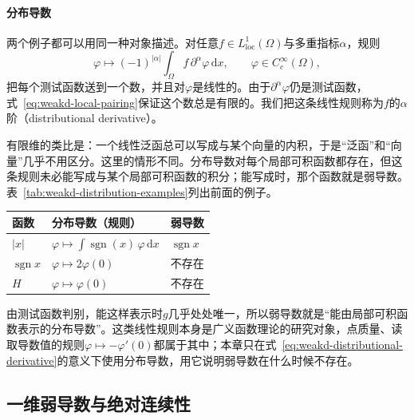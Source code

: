 \paragraph{分布导数}
两个例子都可以用同一种对象描述。对任意$f\in L^1_{\mathrm{loc}}(\Omega)$与多重指标$\alpha$，规则
\begin{equation}
\varphi\longmapsto(-1)^{\lvert\alpha\rvert}\int_\Omega f\,\partial^\alpha\varphi\,\mathrm dx ,\qquad\varphi\in C_c^\infty(\Omega),
\label{eq:weakd-distributional-derivative}
\end{equation}
把每个测试函数送到一个数，并且对$\varphi$是线性的。由于$\partial^\alpha\varphi$仍是测试函数，式~\eqref{eq:weakd-local-pairing}保证这个数总是有限的。我们把这条线性规则称为$f$的$\alpha$阶（distributional derivative）。

有限维的类比是：一个线性泛函总可以写成与某个向量的内积，于是“泛函”和“向量”几乎不用区分。这里的情形不同。分布导数对每个局部可积函数都存在，但这条规则未必能写成与某个局部可积函数的积分；能写成时，那个函数就是弱导数。表~\ref{tab:weakd-distribution-examples}列出前面的例子。

\begin{BookInlineTable}
  \centering
  \begin{tabular}{@{}lll@{}}
    \toprule
    函数 & 分布导数（规则） & 弱导数\\
    \midrule
    $\lvert x\rvert$ & $\varphi\mapsto\int\operatorname{sgn}(x)\,\varphi\,\mathrm dx$ & $\operatorname{sgn}x$\\
    $\operatorname{sgn}x$ & $\varphi\mapsto2\varphi(0)$ & 不存在\\
    $H$ & $\varphi\mapsto\varphi(0)$ & 不存在\\
    \bottomrule
  \end{tabular}
  \caption{一阶分布导数与弱导数。}
  \label{tab:weakd-distribution-examples}
\end{BookInlineTable}

由测试函数判别，能这样表示时$g$几乎处处唯一，所以弱导数就是“能由局部可积函数表示的分布导数”。这类线性规则本身是广义函数理论的研究对象，点质量、读取导数值的规则$\varphi\mapsto-\varphi'(0)$都属于其中；本章只在式~\eqref{eq:weakd-distributional-derivative}的意义下使用分布导数，用它说明弱导数在什么时候不存在。

\subsection{一维弱导数与绝对连续性}
\label{sec:weakd-one-dimension}

